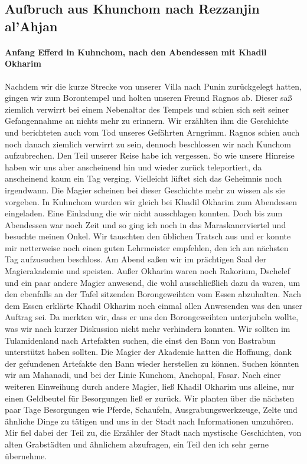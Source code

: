 \subsection{Aufbruch aus Khunchom nach Rezzanjin al'Ahjan}

\paragraph{Anfang Efferd in Kuhnchom, nach den Abendessen mit Khadil Okharim}
Nachdem wir die kurze Strecke von unserer Villa nach Punin zurückgelegt hatten, gingen wir zum Borontempel und holten unseren Freund Ragnos ab. Dieser saß ziemlich verwirrt bei einem Nebenaltar des Tempels und schien sich seit seiner Gefangennahme an nichts mehr zu erinnern. Wir erzählten ihm die Geschichte und berichteten auch vom Tod unseres Gefährten Arngrimm. Ragnos schien auch noch danach ziemlich verwirrt zu sein, dennoch beschlossen wir nach Kunchom aufzubrechen. Den Teil unserer Reise habe ich vergessen. So wie unsere Hinreise haben wir uns aber anscheinend hin und wieder zurück teleportiert, da anscheinend kaum ein Tag verging. Vielleicht lüftet sich das Geheimnis noch irgendwann. Die Magier scheinen bei dieser Geschichte mehr zu wissen als sie vorgeben.
In Kuhnchom wurden wir gleich bei Khadil Okharim zum Abendessen eingeladen. Eine Einladung die wir nicht ausschlagen konnten. Doch bis zum Abendessen war noch Zeit und so ging ich noch in das Maraskanerviertel und besuchte meinen Onkel. Wir tauschten den üblichen Tratsch aus und er konnte mir netterweise noch einen guten Lehrmeister empfehlen, den ich am nächsten Tag aufzusuchen beschloss. Am Abend saßen wir im prächtigen Saal der Magierakademie und speisten. Außer Okharim waren noch Rakorium, Dschelef und ein paar andere Magier anwesend, die wohl ausschließlich dazu da waren, um den ebenfalls an der Tafel sitzenden Borongeweihten vom Essen abzuhalten. Nach dem Essen erklärte Khadil Okharim noch einmal allen Anwesenden was den unser Auftrag sei. Da merkten wir, dass er uns den Borongeweihten unterjubeln wollte, was wir nach kurzer Diskussion nicht mehr verhindern konnten. Wir sollten im Tulamidenland nach Artefakten suchen, die einst den Bann von Bastrabun unterstützt haben sollten. Die Magier der Akademie hatten die Hoffnung, dank der gefundenen Artefakte den Bann wieder herstellen zu können. Suchen könnten wir am Mahanadi, und bei der Linie Kunchom, Anchopal, Fasar. Nach einer weiteren Einweihung durch andere Magier, ließ Khadil Okharim uns alleine, nur einen Geldbeutel für Besorgungen ließ er zurück. Wir planten über die nächsten paar Tage Besorgungen wie Pferde, Schaufeln, Ausgrabungswerkzeuge, Zelte und ähnliche Dinge zu tätigen und uns in der Stadt nach Informationen umzuhören. Mir fiel dabei der Teil zu, die Erzähler der Stadt nach mystische Geschichten, von alten Grabstädten und ähnlichem abzufragen, ein Teil den ich sehr gerne übernehme.

